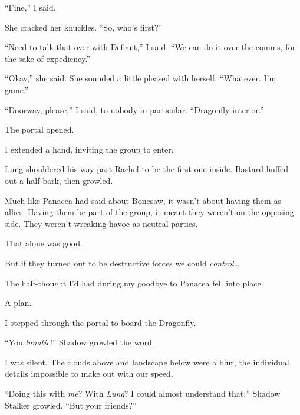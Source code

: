 ``Fine,'' I said.



She cracked her knuckles.  ``So, who's first?''



``Need to talk that over with Defiant,'' I said.  ``We can do it over the comms, for the sake of expediency.''



``Okay,'' she said.  She sounded a little pleased with herself.  ``Whatever.  I'm game.''



``Doorway, please,'' I said, to nobody in particular.  ``Dragonfly interior.''



The portal opened.



I extended a hand, inviting the group to enter.



Lung shouldered his way past Rachel to be the first one inside.  Bastard huffed out a half-bark, then growled.



Much like Panacea had said about Bonesaw, it wasn't about having them as allies.  Having them be part of the group, it meant they weren't on the opposing side.  They weren't wreaking havoc as neutral parties.



That alone was good.



But if they turned out to be destructive forces we could \emph{control}\ldots



The half-thought I'd had during my goodbye to Panacea fell into place.



A plan.



I stepped through the portal to board the Dragonfly.



\blacksquare



``You \emph{lunatic}!''  Shadow growled the word.



I was silent.  The clouds above and landscape below were a blur, the individual details impossible to make out with our speed.



``Doing this with \emph{me}?  With \emph{Lung}?  I could almost understand that,'' Shadow Stalker growled.  ``But your friends?''



